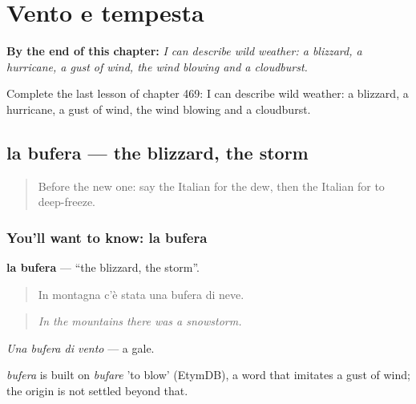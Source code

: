 
\chapter{Vento e tempesta}
\label{ch:it-vento-e-tempesta}

\begin{chapteropening}
\textbf{By the end of this chapter:} \emph{I can describe wild weather: a blizzard, a hurricane, a gust of wind, the wind blowing and a cloudburst.}

Complete the last lesson of chapter 469: I can describe wild weather: a blizzard, a hurricane, a gust of wind, the wind blowing and a cloudburst.
\end{chapteropening}

\section[la bufera]{la bufera — the blizzard, the storm}

\label{lesson:IT-C469-bufera}



\begin{quote}
Before the new one: say the Italian for the dew, then the Italian for to deep-freeze.
\end{quote}

\subsection*{You'll want to know: la bufera}
\textbf{la bufera} — \textquotedblleft{}the blizzard, the storm\textquotedblright{}.

\begin{quote}
In montagna c'è stata una bufera di neve.
\end{quote}

\begin{quote}
\emph{In the mountains there was a snowstorm.}
\end{quote}

\emph{Una bufera di vento} — a gale.

\begin{cousinweb}
\emph{bufera} is built on \emph{bufare} 'to blow' (EtymDB), a word that imitates a gust of wind; the origin is not settled beyond that.
\end{cousinweb}

